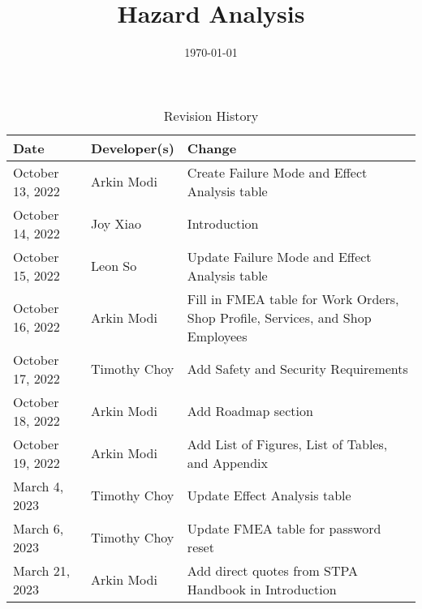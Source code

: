 \documentclass{article}
\title{Hazard Analysis\\\progname}
\author{\authname}
\date{\today}
\begin{document}
\maketitle
\thispagestyle{empty}

\newpage


\begin{table}[hp]
	\caption{Revision History} \label{TblRevisionHistory}
	\begin{tabularx}{\textwidth}{llX}
		\toprule
		\textbf{Date}    & \textbf{Developer(s)} & \textbf{Change}                                                                \\
		\midrule
		October 13, 2022 & Arkin Modi            & Create Failure Mode and Effect Analysis table                                  \\
		October 14, 2022 & Joy Xiao              & Introduction                                                                   \\
		October 15, 2022 & Leon So               & Update Failure Mode and Effect Analysis table                                  \\
		October 16, 2022 & Arkin Modi            & Fill in FMEA table for Work Orders, Shop Profile, Services, and Shop Employees \\
		October 17, 2022 & Timothy Choy          & Add Safety and Security Requirements                                           \\
		October 18, 2022 & Arkin Modi            & Add Roadmap section                                                            \\
		October 19, 2022 & Arkin Modi            & Add List of Figures, List of Tables, and Appendix                              \\
		March 4, 2023    & Timothy Choy          & Update Effect Analysis table                                                   \\
		March 6, 2023    & Timothy Choy          & Update FMEA table for password reset                                           \\
		March 21, 2023   & Arkin Modi            & Add direct quotes from STPA Handbook in Introduction                           \\
		\bottomrule
	\end{tabularx}
\end{table}

\newpage
\end{document}
